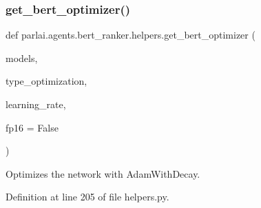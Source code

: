 \mbox{\label{namespaceparlai_1_1agents_1_1bert__ranker_1_1helpers_a7a144c1f6c9af7925e754b9b61c0e6fb}} 
\subsubsection{\texorpdfstring{get\+\_\+bert\+\_\+optimizer()}{get\_bert\_optimizer()}}
{\footnotesize\ttfamily def parlai.\+agents.\+bert\+\_\+ranker.\+helpers.\+get\+\_\+bert\+\_\+optimizer (\begin{DoxyParamCaption}\item[{}]{models,  }\item[{}]{type\+\_\+optimization,  }\item[{}]{learning\+\_\+rate,  }\item[{}]{fp16 = {\ttfamily False} }\end{DoxyParamCaption})}

\begin{DoxyVerb}Optimizes the network with AdamWithDecay.
\end{DoxyVerb}
 

Definition at line 205 of file helpers.\+py.



